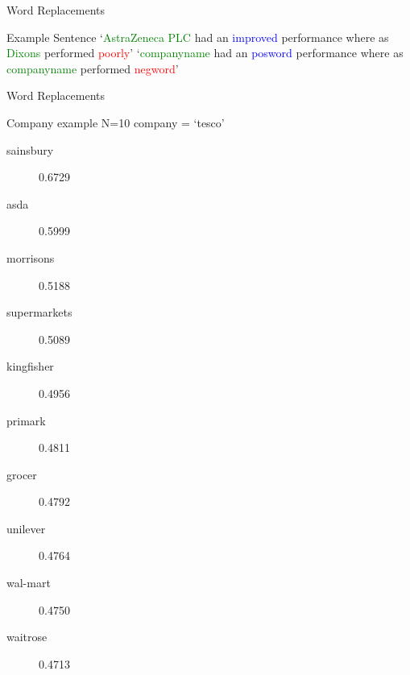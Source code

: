 \documentclass[10pt]{beamer}
\begin{document}
\begin{frame}[fragile]{Word Replacements}
\begin{block}{Example Sentence}
`\textcolor{green}{AstraZeneca PLC} had an \textcolor{blue}{improved} performance where as \textcolor{green}{Dixons} performed \textcolor{red}{poorly}'\newline\newline
`\textcolor{green}{companyname} had an \textcolor{blue}{posword} performance where as \textcolor{green}{companyname} performed \textcolor{red}{negword}'
\end{block}

\end{frame}

\begin{frame}[fragile]{Word Replacements}
\begin{block}{Company example N=10 company = `tesco'}
\begin{multicols}{2}
\begin{description}
\item [sainsbury] 0.6729
\item [asda] 0.5999
\item [morrisons] 0.5188
\item [supermarkets] 0.5089
\item [kingfisher] 0.4956
\item [primark] 0.4811
\item [grocer] 0.4792
\item [unilever] 0.4764
\item [wal-mart] 0.4750
\item [waitrose] 0.4713
\end{description}
\end{multicols}

\end{block}

\end{frame}
\end{document}

